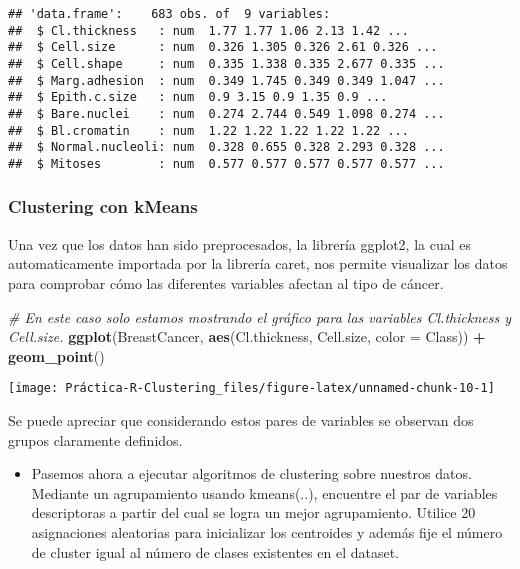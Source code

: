 \documentclass[]{article}
\newenvironment{Shaded}{\begin{snugshade}}{\end{snugshade}}
\newcommand{\CommentTok}[1]{\textcolor[rgb]{0.56,0.35,0.01}{\textit{#1}}}
\newcommand{\DataTypeTok}[1]{\textcolor[rgb]{0.13,0.29,0.53}{#1}}
\newcommand{\KeywordTok}[1]{\textcolor[rgb]{0.13,0.29,0.53}{\textbf{#1}}}
\newcommand{\NormalTok}[1]{#1}
\newcommand{\OperatorTok}[1]{\textcolor[rgb]{0.81,0.36,0.00}{\textbf{#1}}}
\newcommand{\StringTok}[1]{\textcolor[rgb]{0.31,0.60,0.02}{#1}}
\providecommand{\tightlist}{%
  \setlength{\itemsep}{0pt}\setlength{\parskip}{0pt}}
\begin{document}
\begin{verbatim}
## 'data.frame':    683 obs. of  9 variables:
##  $ Cl.thickness   : num  1.77 1.77 1.06 2.13 1.42 ...
##  $ Cell.size      : num  0.326 1.305 0.326 2.61 0.326 ...
##  $ Cell.shape     : num  0.335 1.338 0.335 2.677 0.335 ...
##  $ Marg.adhesion  : num  0.349 1.745 0.349 0.349 1.047 ...
##  $ Epith.c.size   : num  0.9 3.15 0.9 1.35 0.9 ...
##  $ Bare.nuclei    : num  0.274 2.744 0.549 1.098 0.274 ...
##  $ Bl.cromatin    : num  1.22 1.22 1.22 1.22 1.22 ...
##  $ Normal.nucleoli: num  0.328 0.655 0.328 2.293 0.328 ...
##  $ Mitoses        : num  0.577 0.577 0.577 0.577 0.577 ...
\end{verbatim}

\hypertarget{clustering-con-kmeans}{%
\subsubsection{Clustering con kMeans}\label{clustering-con-kmeans}}

Una vez que los datos han sido preprocesados, la librería ggplot2, la
cual es automaticamente importada por la librería caret, nos permite
visualizar los datos para comprobar cómo las diferentes variables
afectan al tipo de cáncer.

\begin{Shaded}
\begin{Highlighting}[]
\CommentTok{# En este caso solo estamos mostrando el gráfico para las variables Cl.thickness y Cell.size.}
\KeywordTok{ggplot}\NormalTok{(BreastCancer, }\KeywordTok{aes}\NormalTok{(Cl.thickness, Cell.size, }\DataTypeTok{color =}\NormalTok{ Class)) }\OperatorTok{+}\StringTok{ }\KeywordTok{geom_point}\NormalTok{()}
\end{Highlighting}
\end{Shaded}

\begin{center}\texttt{[image: Práctica-R-Clustering\_files/figure-latex/unnamed-chunk-10-1]} \end{center}

Se puede apreciar que considerando estos pares de variables se observan
dos grupos claramente definidos.

\begin{itemize}
\tightlist
\item
  Pasemos ahora a ejecutar algoritmos de clustering sobre nuestros
  datos. Mediante un agrupamiento usando kmeans(..), encuentre el par de
  variables descriptoras a partir del cual se logra un mejor
  agrupamiento. Utilice 20 asignaciones aleatorias para inicializar los
  centroides y además fije el número de cluster igual al número de
  clases existentes en el dataset.
\end{itemize}
\end{document}
